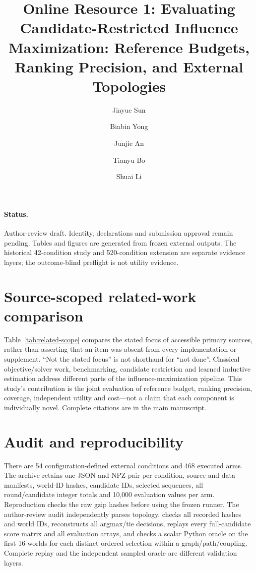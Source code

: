 \documentclass[smallextended]{svjour3}
\begin{document}
\title{Online Resource 1: Evaluating Candidate-Restricted Influence Maximization: Reference Budgets, Ranking Precision, and External Topologies}
\author{Jiayue Sun \and Binbin Yong \and Junjie An \and Tianyu Bo \and Shuai Li}
\date{}\maketitle
\paragraph{Status.} Author-review draft. Identity, declarations and submission approval remain pending. Tables and figures are generated from frozen external outputs. The historical 42-condition study and 520-condition extension are separate evidence layers; the outcome-blind preflight is not utility evidence.

\section{Source-scoped related-work comparison}
Table~\ref{tab:related-scope} compares the stated focus of accessible primary
sources, rather than asserting that an item was absent from every implementation
or supplement. ``Not the stated focus'' is not shorthand for ``not done''.
Classical objective/solver work, benchmarking, candidate restriction and learned
inductive estimation address different parts of the influence-maximization
pipeline. This study's contribution is the joint evaluation of reference budget,
ranking precision, coverage, independent utility and cost---not a claim that each
component is individually novel. Complete citations are in the main manuscript.

\FloatBarrier

\section{Audit and reproducibility}
There are 54 configuration-defined external conditions and 468 executed arms.
The archive retains one JSON and NPZ pair per condition, source and data manifests,
world-ID hashes, candidate IDs, selected sequences, all round/candidate integer
totals and 10,000 evaluation values per arm. Reproduction checks the raw gzip
hashes before using the frozen runner. The author-review audit independently
parses topology, checks all recorded hashes and world IDs, reconstructs all
argmax/tie decisions, replays every full-candidate score matrix and all evaluation
arrays, and checks a scalar Python oracle on the first 16 worlds for each
distinct ordered selection within a graph/path/coupling. Complete replay and the
independent sampled oracle are different validation layers.
\end{document}
